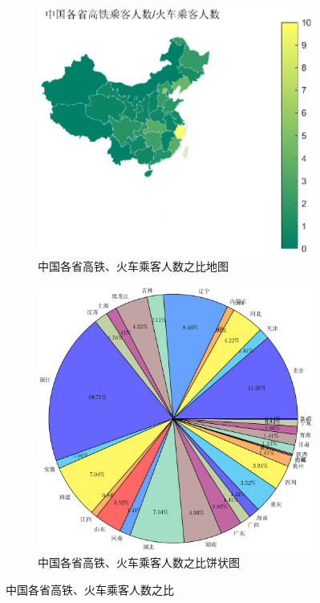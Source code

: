 \documentclass{ctexart}
\newcounter{sub}
\begin{document}
\begin{figure}[htpb]
	\centering
	\begin{subfigure}[htpb]{.45\linewidth}
		\centering
		\includegraphics[width=0.8\linewidth]{map.eps}
		\caption{中国各省高铁、火车乘客人数之比地图}
		\label{fig:中国各省高铁、火车乘客人数之比地图}
	\end{subfigure}
	\quad
	\begin{subfigure}[htpb]{.45\linewidth}
		\centering
		\includegraphics[width=0.8\linewidth]{pie.pdf}
		\caption{中国各省高铁、火车乘客人数之比饼状图}
		\label{fig:中国各省高铁、火车乘客人数之比饼状图}
	\end{subfigure}
	\quad
	\caption{中国各省高铁、火车乘客人数之比}
	\label{fig:中国各省高铁、火车乘客人数之比}
\end{figure}
\end{document}
